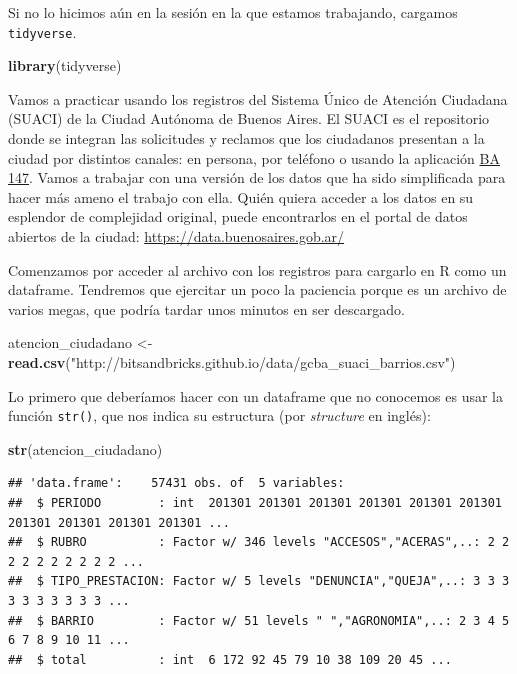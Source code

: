 \documentclass[spanish,]{book}
\newenvironment{Shaded}{\begin{snugshade}}{\end{snugshade}}
\newcommand{\KeywordTok}[1]{\textcolor[rgb]{0.13,0.29,0.53}{\textbf{#1}}}
\newcommand{\NormalTok}[1]{#1}
\newcommand{\StringTok}[1]{\textcolor[rgb]{0.31,0.60,0.02}{#1}}
\begin{document}
Si no lo hicimos aún en la sesión en la que estamos trabajando, cargamos \texttt{tidyverse}.

\begin{Shaded}
\begin{Highlighting}[]
\KeywordTok{library}\NormalTok{(tidyverse)}
\end{Highlighting}
\end{Shaded}

Vamos a practicar usando los registros del Sistema Único de Atención Ciudadana (SUACI) de la Ciudad Autónoma de Buenos Aires. El SUACI es el repositorio donde se integran las solicitudes y reclamos que los ciudadanos presentan a la ciudad por distintos canales: en persona, por teléfono o usando la aplicación \href{https://gestioncolaborativa.buenosaires.gob.ar/prestaciones}{BA 147}. Vamos a trabajar con una versión de los datos que ha sido simplificada para hacer más ameno el trabajo con ella. Quién quiera acceder a los datos en su esplendor de complejidad original, puede encontrarlos en el portal de datos abiertos de la ciudad: \url{https://data.buenosaires.gob.ar/}

Comenzamos por acceder al archivo con los registros para cargarlo en R como un dataframe. Tendremos que ejercitar un poco la paciencia porque es un archivo de varios megas, que podría tardar unos minutos en ser descargado.

\begin{Shaded}
\begin{Highlighting}[]
\NormalTok{atencion_ciudadano <-}\StringTok{ }\KeywordTok{read.csv}\NormalTok{(}\StringTok{"http://bitsandbricks.github.io/data/gcba_suaci_barrios.csv"}\NormalTok{)}
\end{Highlighting}
\end{Shaded}

Lo primero que deberíamos hacer con un dataframe que no conocemos es usar la función \texttt{str()}, que nos indica su estructura (por \emph{structure} en inglés):

\begin{Shaded}
\begin{Highlighting}[]
\KeywordTok{str}\NormalTok{(atencion_ciudadano)}
\end{Highlighting}
\end{Shaded}

\begin{verbatim}
## 'data.frame':    57431 obs. of  5 variables:
##  $ PERIODO        : int  201301 201301 201301 201301 201301 201301 201301 201301 201301 201301 ...
##  $ RUBRO          : Factor w/ 346 levels "ACCESOS","ACERAS",..: 2 2 2 2 2 2 2 2 2 2 ...
##  $ TIPO_PRESTACION: Factor w/ 5 levels "DENUNCIA","QUEJA",..: 3 3 3 3 3 3 3 3 3 3 ...
##  $ BARRIO         : Factor w/ 51 levels " ","AGRONOMIA",..: 2 3 4 5 6 7 8 9 10 11 ...
##  $ total          : int  6 172 92 45 79 10 38 109 20 45 ...
\end{verbatim}
\end{document}
